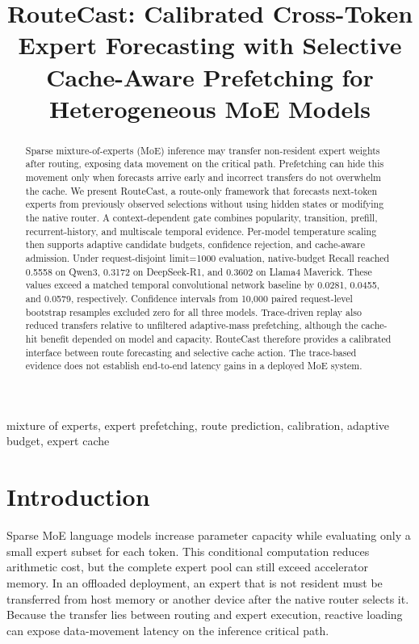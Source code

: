 \documentclass[conference]{IEEEtran}
\title{RouteCast: Calibrated Cross-Token Expert Forecasting with Selective Cache-Aware Prefetching for Heterogeneous MoE Models}
\author{\IEEEauthorblockN{Jihua Dong}
\IEEEauthorblockA{\textit{School of Microelectronics} \\
\textit{University of Electronic Science and Technology of China}\\
Chengdu, China \\
2023190903038@std.uestc.edu.cn}}
\begin{document}
\maketitle

\begin{abstract}
Sparse mixture-of-experts (MoE) inference may transfer non-resident expert weights after routing, exposing data movement on the critical path. Prefetching can hide this movement only when forecasts arrive early and incorrect transfers do not overwhelm the cache. We present RouteCast, a route-only framework that forecasts next-token experts from previously observed selections without using hidden states or modifying the native router. A context-dependent gate combines popularity, transition, prefill, recurrent-history, and multiscale temporal evidence. Per-model temperature scaling then supports adaptive candidate budgets, confidence rejection, and cache-aware admission. Under request-disjoint limit=1000 evaluation, native-budget Recall reached 0.5558 on Qwen3, 0.3172 on DeepSeek-R1, and 0.3602 on Llama4 Maverick. These values exceed a matched temporal convolutional network baseline by 0.0281, 0.0455, and 0.0579, respectively. Confidence intervals from 10,000 paired request-level bootstrap resamples excluded zero for all three models. Trace-driven replay also reduced transfers relative to unfiltered adaptive-mass prefetching, although the cache-hit benefit depended on model and capacity. RouteCast therefore provides a calibrated interface between route forecasting and selective cache action. The trace-based evidence does not establish end-to-end latency gains in a deployed MoE system.
\end{abstract}

\begin{IEEEkeywords}
mixture of experts, expert prefetching, route prediction, calibration, adaptive budget, expert cache
\end{IEEEkeywords}

\section{Introduction}
Sparse MoE language models increase parameter capacity while evaluating only a small expert subset for each token. This conditional computation reduces arithmetic cost, but the complete expert pool can still exceed accelerator memory. In an offloaded deployment, an expert that is not resident must be transferred from host memory or another device after the native router selects it. Because the transfer lies between routing and expert execution, reactive loading can expose data-movement latency on the inference critical path.
\end{document}
